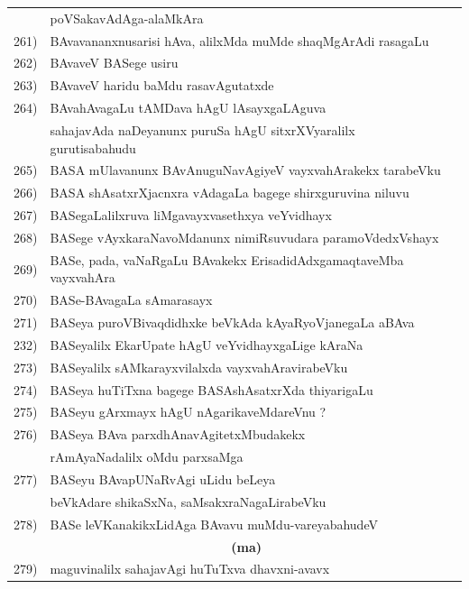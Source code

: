 \begin{longtable}{@{}cp{7.4cm}r}
     & poVSakavAdAga-alaMkAra & \pageref{page245}\\
261) & BAvavananxnusarisi hAva, alilxMda muMde shaqMgArAdi rasagaLu &\pageref{page226}\\
262) & BAvaveV BASege usiru & \pageref{page9}\\
263) & BAvaveV haridu baMdu rasavAgutatxde & \pageref{page229}\\
264) & BAvahAvagaLu tAMDava hAgU lAsayxgaLAguva & \\
     & sahajavAda naDeyanunx puruSa hAgU sitxrXVyaralilx gurutisabahudu & \pageref{page226a}\\
265) & BASA mUlavanunx BAvAnuguNavAgiyeV vayxvahArakekx tarabeVku & \pageref{page10a}\\
266) & BASA shAsatxrXjacnxra vAdagaLa bagege shirxguruvina niluvu & \pageref{page5}\\
267) & BASegaLalilxruva liMgavayxvasethxya veYvidhayx & \pageref{page17}\\
268) & BASege vAyxkaraNavoMdanunx nimiRsuvudara paramoVdedxVshayx & \pageref{page34}\\
269) & BASe, pada, vaNaRgaLu BAvakekx ErisadidAdxgamaqtaveMba vayxvahAra & \pageref{page185a}\\
270) & BASe-BAvagaLa sAmarasayx & \pageref{page24}\\
271) & BASeya puroVBivaqdidhxke beVkAda kAyaRyoVjanegaLa aBAva & \pageref{page31}\\
232) & BASeyalilx EkarUpate hAgU veYvidhayxgaLige kAraNa & \pageref{page11b}\\
273) & BASeyalilx sAMkarayxvilalxda vayxvahAravirabeVku & \pageref{page174a}\\  
274) & BASeya huTiTxna bagege BASAshAsatxrXda thiyarigaLu & \pageref{page3a}\\
275) & BASeyu gArxmayx hAgU nAgarikaveMdareVnu ? & \pageref{page11a}\\
276) & BASeya BAva parxdhAnavAgitetxMbudakekx & \\
     & rAmAyaNadalilx oMdu parxsaMga & \pageref{page13}\\
277) & BASeyu BAvapUNaRvAgi uLidu beLeya  & \\
     & beVkAdare shikaSxNa, saMsakxraNagaLirabeVku & \pageref{page16}\\
278) & BASe leVKanakikxLidAga BAvavu muMdu-vareyabahudeV & \pageref{page186a}\\[0.3cm]
     &  \multicolumn{1}{c}{\textbf{(ma)}} & \\[0.3cm]
279) & maguvinalilx sahajavAgi huTuTxva dhavxni-avavx & \pageref{page6}\\

\end{longtable}
